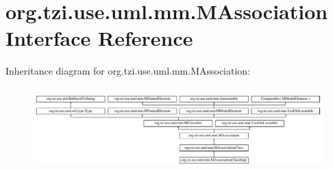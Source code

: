 \hypertarget{interfaceorg_1_1tzi_1_1use_1_1uml_1_1mm_1_1_m_association}{\section{org.\-tzi.\-use.\-uml.\-mm.\-M\-Association Interface Reference}
\label{interfaceorg_1_1tzi_1_1use_1_1uml_1_1mm_1_1_m_association}
}
Inheritance diagram for org.\-tzi.\-use.\-uml.\-mm.\-M\-Association\-:\begin{figure}[H]
\begin{center}
\leavevmode
\includegraphics[height=3.268482cm]{interfaceorg_1_1tzi_1_1use_1_1uml_1_1mm_1_1_m_association}
\end{center}
\end{figure}
